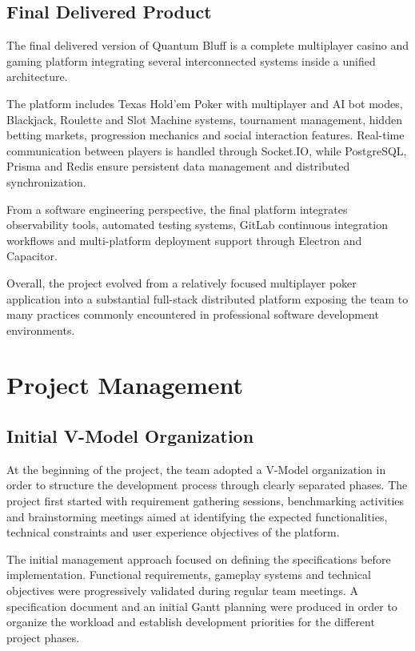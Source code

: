 \documentclass[11pt,a4paper]{article}
\begin{document}
\subsection{Final Delivered Product}

The final delivered version of Quantum Bluff is a complete multiplayer casino and gaming platform integrating several interconnected systems inside a unified architecture.

The platform includes Texas Hold'em Poker with multiplayer and AI bot modes, Blackjack, Roulette and Slot Machine systems, tournament management, hidden betting markets, progression mechanics and social interaction features. Real-time communication between players is handled through Socket.IO, while PostgreSQL, Prisma and Redis ensure persistent data management and distributed synchronization.

From a software engineering perspective, the final platform integrates observability tools, automated testing systems, GitLab continuous integration workflows and multi-platform deployment support through Electron and Capacitor.

Overall, the project evolved from a relatively focused multiplayer poker application into a substantial full-stack distributed platform exposing the team to many practices commonly encountered in professional software development environments.
\newpage
\section{Project Management}

\subsection{Initial V-Model Organization}

At the beginning of the project, the team adopted a V-Model organization in order to structure the development process through clearly separated phases. The project first started with requirement gathering sessions, benchmarking activities and brainstorming meetings aimed at identifying the expected functionalities, technical constraints and user experience objectives of the platform.

The initial management approach focused on defining the specifications before implementation. Functional requirements, gameplay systems and technical objectives were progressively validated during regular team meetings. A specification document and an initial Gantt planning were produced in order to organize the workload and establish development priorities for the different project phases.
\end{document}
